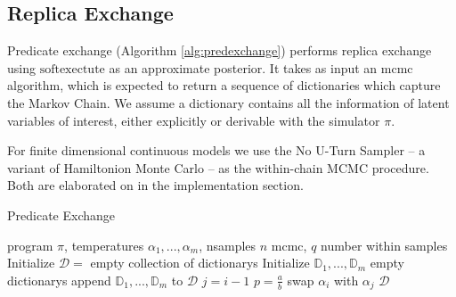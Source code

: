 \subsection{Replica Exchange}

Predicate exchange (Algorithm \ref{alg:predexchange}) performs replica exchange using $\textrm{softexectute}$ as an approximate posterior.
It takes as input an mcmc algorithm, which is expected to return a sequence of dictionaries which capture the Markov Chain.
We assume a dictionary contains all the information of latent variables of interest, either explicitly or derivable with the simulator $\pi$. 

For finite dimensional continuous models we use the No U-Turn Sampler \cite{hoffman2014no} -- a variant of Hamiltonion Monte Carlo -- as the within-chain MCMC procedure. 
Both are elaborated on in the implementation section.

\begin{algorithm}[tb]
  \caption{Predicate Exchange}
  \label{alg:predexchange}
\begin{algorithmic}
 program $\pi$, temperatures $\alpha_1, ...,\alpha_m$, nsamples $n$
 mcmc, $q$ number within samples
\STATE Initialize $\mathcal{D} = $ empty collection of dictionarys
\STATE Initialize $\mathbb{D}_1,...,\mathbb{D}_m$ empty dictionarys
\REPEAT
      \STATE append $\mathbb{D}_1,...,\mathbb{D}_m$ to $\mathcal{D}$
    \ENDIF
  \ENDFOR
    \STATE $j = i - 1$
    \STATE $p = \frac{a}{b}$
      \STATE swap $\alpha_i$ with $\alpha_j$
    \ENDIF
  \ENDFOR
{}
 $\mathcal{D}$
\end{algorithmic}
\end{algorithm}
